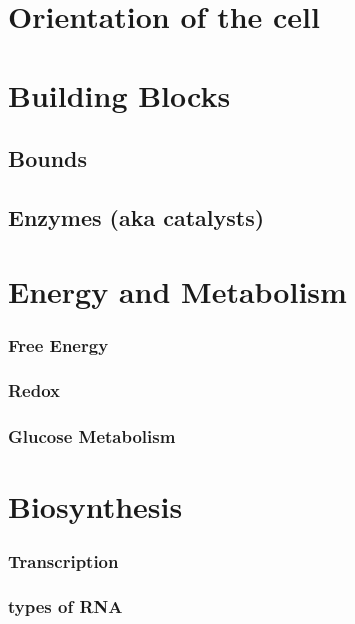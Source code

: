 \documentclass[12pt]{cheatsheet}
\author{Gian Maria Ernst - ernstg\\  \vspace*{0.2em} \vspace*{-0.2em}}\doctitle{Bioengineering}
\begin{document}
\small


\section*{Orientation of the cell}


\section*{Building Blocks}

\subsection*{Bounds}


\subsection*{Enzymes (aka catalysts)}


\section*{Energy and Metabolism}

\subsubsection*{Free Energy}

\subsubsection*{Redox}

\subsubsection*{Glucose Metabolism}


\section*{Biosynthesis}

\subsubsection*{Transcription}

\subsubsection*{types of RNA}

\end{document}

